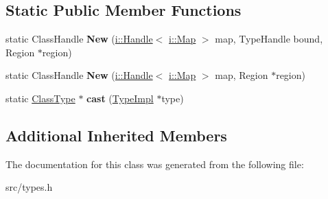 \subsection*{Static Public Member Functions}
\begin{DoxyCompactItemize}
\item 
\hypertarget{classv8_1_1internal_1_1_type_impl_1_1_class_type_a3f15fc86faa01b8a700aeb4d9713fe7d}{}static Class\+Handle {\bfseries New} (\hyperlink{classv8_1_1internal_1_1_handle}{i\+::\+Handle}$<$ \hyperlink{classv8_1_1internal_1_1_map}{i\+::\+Map} $>$ map, Type\+Handle bound, Region $\ast$region)\label{classv8_1_1internal_1_1_type_impl_1_1_class_type_a3f15fc86faa01b8a700aeb4d9713fe7d}

\item 
\hypertarget{classv8_1_1internal_1_1_type_impl_1_1_class_type_a6bf01072a2d612de60f83b61ec887751}{}static Class\+Handle {\bfseries New} (\hyperlink{classv8_1_1internal_1_1_handle}{i\+::\+Handle}$<$ \hyperlink{classv8_1_1internal_1_1_map}{i\+::\+Map} $>$ map, Region $\ast$region)\label{classv8_1_1internal_1_1_type_impl_1_1_class_type_a6bf01072a2d612de60f83b61ec887751}

\item 
\hypertarget{classv8_1_1internal_1_1_type_impl_1_1_class_type_af55d5306ccc4599c6f80442e6d5365cd}{}static \hyperlink{classv8_1_1internal_1_1_type_impl_1_1_class_type}{Class\+Type} $\ast$ {\bfseries cast} (\hyperlink{classv8_1_1internal_1_1_type_impl}{Type\+Impl} $\ast$type)\label{classv8_1_1internal_1_1_type_impl_1_1_class_type_af55d5306ccc4599c6f80442e6d5365cd}

\end{DoxyCompactItemize}
\subsection*{Additional Inherited Members}


The documentation for this class was generated from the following file\+:\begin{DoxyCompactItemize}
\item 
src/types.\+h\end{DoxyCompactItemize}
